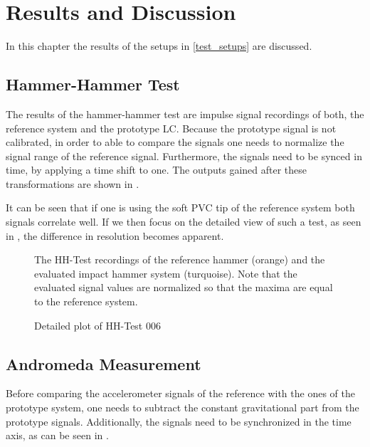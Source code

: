 \chapter{Results and Discussion}
\label{chp:results}

In this chapter the results of the setups in \autoref{test_setups} are discussed.

\section{Hammer-Hammer Test}

The results of the hammer-hammer test are impulse signal recordings of both, the reference system and the prototype \ac{LC}. Because the prototype signal is not calibrated, in order to able to compare the signals one needs to normalize the signal range of the reference signal. Furthermore, the signals need to be synced in time, by applying a time shift to one. The outputs gained after these transformations are shown in .

It can be seen that if one is using the soft PVC tip of the reference system both signals correlate well. If we then focus on the detailed view of such a test, as seen in , the difference in resolution becomes apparent.

\begin{figure}[!htb]
  \centering
  
  \caption[HH-Test comparison]{The HH-Test recordings of the reference hammer (orange) and the evaluated impact hammer system (turquoise). Note that the evaluated signal values are normalized so that the maxima are equal to the reference system.%
    \label{fig:HH_comparison}}
\end{figure}
\begin{figure}[!htb]
  \centering
  
  \caption[HH006 Plot]{Detailed plot of HH-Test 006%
    \label{fig:HH_noise}}
\end{figure}

\section{Andromeda Measurement}
Before comparing the accelerometer signals of the reference with the ones of the prototype system, one needs to subtract the constant gravitational part from the prototype signals. Additionally, the signals need to be synchronized in the time axis, as can be seen in .

